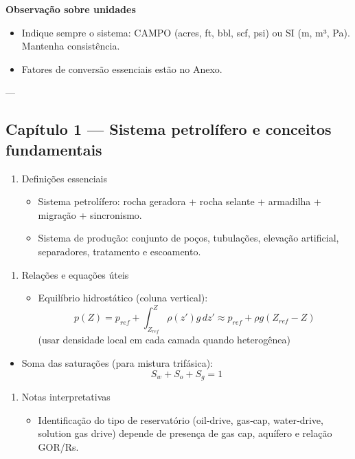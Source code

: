 \documentclass[11pt,a4paper]{article}
\begin{document}
\textbf{Observação sobre unidades}
\begin{itemize}
\item Indique sempre o sistema: CAMPO (acres, ft, bbl, scf, psi) ou SI (m, m³, Pa). Mantenha consistência.
\item Fatores de conversão essenciais estão no Anexo.
\end{itemize}

---

\subsection{Capítulo 1 — Sistema petrolífero e conceitos fundamentais}

\begin{enumerate}
\item Definições essenciais
\begin{itemize}
\item Sistema petrolífero: rocha geradora + rocha selante + armadilha + migração + sincronismo. 
\item Sistema de produção: conjunto de poços, tubulações, elevação artificial, separadores, tratamento e escoamento.
\end{itemize}
\end{enumerate}

\begin{enumerate}
\item Relações e equações úteis
\begin{itemize}
\item Equilíbrio hidrostático (coluna vertical):
$$p(Z)=p_{ref}+\int_{Z_{ref}}^{Z}\rho(z') g\,dz'\approx p_{ref}+\rho g (Z_{ref}-Z)$$
(usar densidade local em cada camada quando heterogênea)
\end{itemize}
\end{enumerate}

\begin{itemize}
\item Soma das saturações (para mistura trifásica):
$$S_w+S_o+S_g=1$$
\end{itemize}

\begin{enumerate}
\item Notas interpretativas
\begin{itemize}
\item Identificação do tipo de reservatório (oil‑drive, gas‑cap, water‑drive, solution gas drive) depende de presença de gas cap, aquífero e relação GOR/Rs.
\end{itemize}
\end{enumerate}
\end{document}
